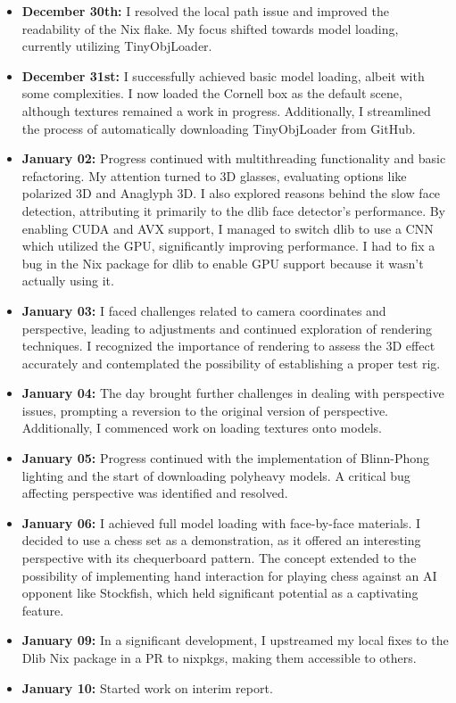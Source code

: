 \begin{itemize}
    \item \textbf{December 30th:} I resolved the local path issue and improved the readability of the Nix flake. My focus shifted towards model loading, currently utilizing TinyObjLoader.

    \item \textbf{December 31st:} I successfully achieved basic model loading, albeit with some complexities. I now loaded the Cornell box as the default scene, although textures remained a work in progress. Additionally, I streamlined the process of automatically downloading TinyObjLoader from GitHub.

    \item \textbf{January 02:} Progress continued with multithreading functionality and basic refactoring. My attention turned to 3D glasses, evaluating options like polarized 3D and Anaglyph 3D. I also explored reasons behind the slow face detection, attributing it primarily to the dlib face detector's performance. By enabling CUDA and AVX support, I managed to switch dlib to use a CNN which utilized the GPU, significantly improving performance. I had to fix a bug in the Nix package for dlib to enable GPU support because it wasn't actually using it.

    \item \textbf{January 03:} I faced challenges related to camera coordinates and perspective, leading to adjustments and continued exploration of rendering techniques. I recognized the importance of rendering to assess the 3D effect accurately and contemplated the possibility of establishing a proper test rig.

    \item \textbf{January 04:} The day brought further challenges in dealing with perspective issues, prompting a reversion to the original version of perspective. Additionally, I commenced work on loading textures onto models.

    \item \textbf{January 05:} Progress continued with the implementation of Blinn-Phong lighting and the start of downloading polyheavy models. A critical bug affecting perspective was identified and resolved.

    \item \textbf{January 06:} I achieved full model loading with face-by-face materials. I decided to use a chess set as a demonstration, as it offered an interesting perspective with its chequerboard pattern. The concept extended to the possibility of implementing hand interaction for playing chess against an AI opponent like Stockfish, which held significant potential as a captivating feature.

    \item \textbf{January 09:} In a significant development, I upstreamed my local fixes to the Dlib Nix package in a PR to nixpkgs, making them accessible to others.

    \item \textbf{January 10:} Started work on interim report.
\end{itemize}

